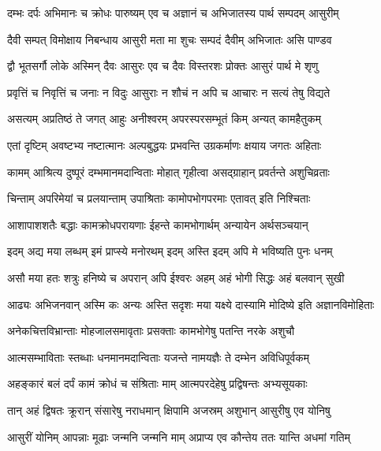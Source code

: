 \twolineshloka
{दम्भः दर्पः अभिमानः च क्रोधः पारुष्यम् एव च}
{अज्ञानं च अभिजातस्य पार्थ सम्पदम् आसुरीम्}%

\twolineshloka
{दैवी सम्पत् विमोक्षाय निबन्धाय आसुरी मता}
{मा शुचः सम्पदं दैवीम् अभिजातः असि पाण्डव}%

\twolineshloka
{द्वौ भूतसर्गौ लोके अस्मिन् दैवः आसुरः एव च}
{दैवः विस्तरशः प्रोक्तः आसुरं पार्थ मे शृणु}%

\twolineshloka
{प्रवृत्तिं च निवृत्तिं च जनाः न विदुः आसुराः}
{न शौचं न अपि च आचारः न सत्यं तेषु विद्यते}%

\twolineshloka
{असत्यम् अप्रतिष्ठं ते जगत् आहुः अनीश्वरम्}
{अपरस्परसम्भूतं किम् अन्यत् कामहैतुकम्}%

\twolineshloka
{एतां दृष्टिम् अवष्टभ्य नष्टात्मानः अल्पबुद्धयः}
{प्रभवन्ति उग्रकर्माणः क्षयाय जगतः अहिताः}%

\twolineshloka
{कामम् आश्रित्य दुष्पूरं दम्भमानमदान्विताः}
{मोहात् गृहीत्वा असद्ग्राहान् प्रवर्तन्ते अशुचिव्रताः}%

\twolineshloka
{चिन्ताम् अपरिमेयां च प्रलयान्ताम् उपाश्रिताः}
{कामोपभोगपरमाः एतावत् इति निश्चिताः}%

\twolineshloka
{आशापाशशतैः बद्धाः कामक्रोधपरायणाः}
{ईहन्ते कामभोगार्थम् अन्यायेन अर्थसञ्चयान्}%

\twolineshloka
{इदम् अद्य मया लब्धम् इमं प्राप्स्ये मनोरथम्}
{इदम् अस्ति इदम् अपि मे भविष्यति पुनः धनम्}%

\twolineshloka
{असौ मया हतः शत्रुः हनिष्ये च अपरान् अपि}
{ईश्वरः अहम् अहं भोगी सिद्धः अहं बलवान् सुखी}%

\twolineshloka
{आढ्यः अभिजनवान् अस्मि कः अन्यः अस्ति सदृशः मया}
{यक्ष्ये दास्यामि मोदिष्ये इति अज्ञानविमोहिताः}%

\twolineshloka
{अनेकचित्तविभ्रान्ताः मोहजालसमावृताः}
{प्रसक्ताः कामभोगेषु पतन्ति नरके अशुचौ}%

\twolineshloka
{आत्मसम्भाविताः स्तब्धाः धनमानमदान्विताः}
{यजन्ते नामयज्ञैः ते दम्भेन अविधिपूर्वकम्}%

\twolineshloka
{अहङ्कारं बलं दर्पं कामं क्रोधं च संश्रिताः}
{माम् आत्मपरदेहेषु प्रद्विषन्तः अभ्यसूयकाः}%

\twolineshloka
{तान् अहं द्विषतः क्रूरान् संसारेषु नराधमान्}
{क्षिपामि अजस्रम् अशुभान् आसुरीषु एव योनिषु}%

\twolineshloka
{आसुरीं योनिम् आपन्नाः मूढाः जन्मनि जन्मनि}
{माम् अप्राप्य एव कौन्तेय ततः यान्ति अधमां गतिम्}%

